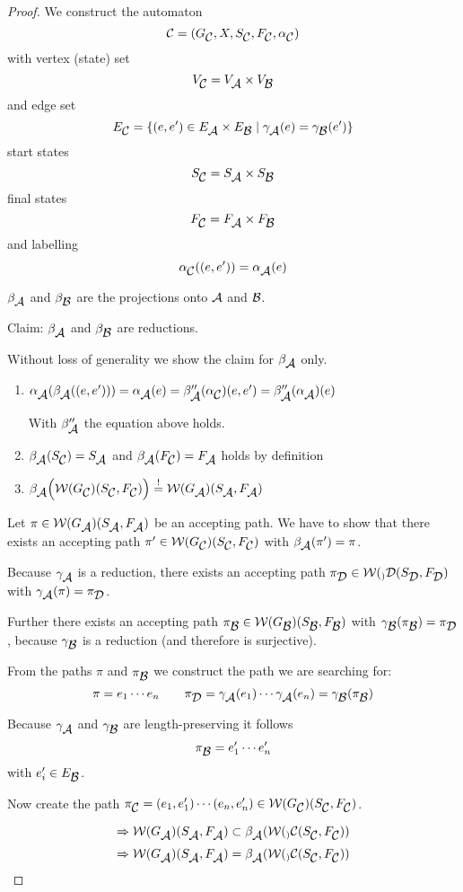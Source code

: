 \begin{proof}
We construct the automaton 
\[ \fa{C} = (G_{\fa{C}}, X, S_{\fa{C}}, F_{\fa{C}}, \alpha_{\fa{C}}) \]
with vertex (state) set
\[ V_{\fa{C}} = V_{\fa{A}} \times V_{\fa{B}} \]
and edge set
\[ E_{\fa{C}} = \{ (e, e') \in E_{\fa{A}} \times E_{\fa{B}} \mid
\gamma_{\fa{A}}(e) = \gamma_{\fa{B}}(e') \} \]
start states
\[ S_{\fa{C}} = S_{\fa{A}} \times S_{\fa{B}} \]
final states
\[ F_{\fa{C}} = F_{\fa{A}} \times F_{\fa{B}} \]
and labelling
\[ \alpha_{\fa{C}}((e, e')) = \alpha_{\fa{A}}(e) \] 

$\beta_{\fa{A}}$ and $\beta_{\fa{B}}$ are the projections onto $\fa{A}$ and
$\fa{B}$.

Claim: $\beta_{\fa{A}}$ and $\beta_{\fa{B}}$ are reductions.

Without loss of generality we show the claim for $\beta_{\fa{A}}$ only.

\begin{enumerate}
\item $\alpha_{\fa{A}}(\beta_{\fa{A}}((e,e'))) = \alpha_{\fa{A}}(e) =
\beta''_{\fa{A}}(\alpha_{\fa{C}})(e, e') = \beta''_{\fa{A}}(\alpha_{\fa{A}})(e)$

With $\beta''_{\fa{A}}$ the equation above holds.
\item $\beta_{\fa{A}}(S_{\fa{C}}) = S_{\fa{A}}$ and $\beta_{\fa{A}}(F_{\fa{C}})
= F_{\fa{A}}$ holds by definition
\item $\beta_{\fa{A}}\Big(\pathcat{G_{\fa{C}}}(S_{\fa{C}}, F_{\fa{C}})\Big)
\stackrel{!}{=} \pathcat{G_{\fa{A}}}(S_{\fa{A}}, F_{\fa{A}})$
\end{enumerate}

Let $\pi \in \pathcat{G_{\fa{A}}}(S_{\fa{A}}, F_{\fa{A}})$ be an accepting path.
We have to show that there exists an accepting path $\pi' \in
\pathcat{G_{\fa{C}}}(S_{\fa{C}}, F_{\fa{C}})$ with $\beta_{\fa{A}}(\pi') = \pi$.

Because $\gamma_{\fa{A}}$ is a reduction, there exists an accepting path
$\pi_{\fa{D}} \in \pathcat_{\fa{D}}(S_{\fa{D}}, F_{\fa{D}})$ with
$\gamma_{\fa{A}}(\pi) = \pi_{\fa{D}}$.

Further there exists an accepting path $\pi_{\fa{B}} \in
\pathcat{G_{\fa{B}}}(S_{\fa{B}}, F_{\fa{B}})$ with
$\gamma_{\fa{B}}(\pi_{\fa{B}}) = \pi_{\fa{D}}$, because $\gamma_{\fa{B}}$ is a
reduction (and therefore is surjective).

From the paths $\pi$ and $\pi_{\fa{B}}$ we construct the path we are searching
for:
\[ \pi = e_1 \cdots e_n \qquad \pi_{\fa{D}} = \gamma_{\fa{A}}(e_1) \cdots
\gamma_{\fa{A}}(e_n) = \gamma_{\fa{B}}(\pi_{\fa{B}}) \]

Because $\gamma_{\fa{A}}$ and $\gamma_{\fa{B}}$ are length-preserving it follows
\[ \pi_{\fa{B}} = e'_1 \cdots e'_n \]
with $e'_i \in E_{\fa{B}}$.

Now create the path $\pi_{\fa{C}} = (e_1, e'_1) \cdots (e_n, e'_n) \in
\pathcat{G_{\fa{C}}}(S_{\fa{C}}, F_{\fa{C}})$.

\[ \Rightarrow \pathcat{G_{\fa{A}}}(S_{\fa{A}}, F_{\fa{A}}) \subset
\beta_{\fa{A}}(\pathcat_{\fa{C}}(S_{\fa{C}}, F_{\fa{C}})) \]
\[ \Rightarrow \pathcat{G_{\fa{A}}}(S_{\fa{A}}, F_{\fa{A}}) =
\beta_{\fa{A}}(\pathcat_{\fa{C}}(S_{\fa{C}}, F_{\fa{C}})) \]
\end{proof}
